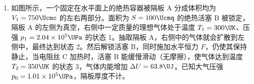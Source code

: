 \documentclass[\gkver]{gaokaozhenti}
\begin{document}
\begin{enumerate}
{（4）相邻两计数点间的时间间隔为 $t = 5T$
打计数点 5 时小车速度的表达式为
$v = \frac{x_{6} - x_{4}}{2t} = \frac{x_{6} - x_{4}}{10T}$
根据逐差法可得小车加速度的表达式是
$a = \frac{x_{6} - x_{3} - x_{3}}{(3t)^{2}} = \frac{x_{6} - 2x_{3}}{(15T)^{2}}$
故选 A。

Ⅱ．（1）把开关 S 接 1，电容器充电，电流从右向左流过微安表，微安表指针迅速向右偏转后示数逐渐减小到零；把开关 S 接 2，电容器放电，电流从左向右流过微安表，则微安表指针迅速向左偏转后示数逐渐减小。故选 C。

（2）由题意可知电压表应选用 $0\sim3\UV$ 量程，由图 2 可知此时分度值为 $0.1\UV$，需要估读到 $0.01\UV$，则读数为 $0.50\UV$。

当微安表示数稳定时，电容器中不再有电流通过，此时干电池、电阻箱、微安表和电压表构成回路，根据闭合电路欧姆定律有
$R + R_{\mathrm{v}} = \frac{E}{I} = \frac{1.5}{160\times10^{-6}}\UO = 9.375\UkO$
根据串联电路规律有
$\frac{R}{R_{\mathrm{v}}} = \frac{U_{R}}{U_{\mathrm{v}}} = \frac{1.5 - 0.5}{0.5} = 2$
联立可得 $R_{\mathrm{v}} \approx 3.1\UkO$

Ⅲ．（1）A．电路 A，定值电阻和热敏电阻并联，电压不变，故不能实现电路的控制，故 A 错误；

B．定值电阻和热敏电阻串联，温度越低，热敏电阻的阻值越大，定值电阻分得电压越小，无法实现 1、2 两端电压大于 $2\UV$，控制开关开启加热系统加热。故 B 错误；

C．定值电阻和热敏电阻串联，温度越低，热敏电阻的阻值越大，热敏电阻分得电压越大，可以实现 1、2 两端电压大于 $2\UV$，控制开关开启加热系统加热。故 C 正确。故选 C。

（2）由热敏电阻 $R_{t}$ 在不同温度时的阻值表可知，$20\UdC$ 的阻值为 $60\times100\UO = 6\UkO$
由题意可知
$U_{12} = \frac{R_{t}}{R_{t} + R}E = \frac{6\UkO}{6\UkO + R}\times3\UV = 2\UV$
解得 $R = 3\UkO$

（3）$28\UdC$ 时 $R_{t}=45\times100\UO=4.5\UkO$，此时 $U_{12}=\frac{4.5\UkO}{4.5\UkO+3\UkO}\times3\UV=1.8\UV$，即 1、2 两端的电压小于 $1.8\UV$ 时，自动关闭加热系统（不考虑控制开关对电路的影响）。
}

\item
如图所示，一个固定在水平面上的绝热容器被隔板 A 分成体积均为 $V_{1} = 750\Ucmc$ 的左右两部分。面积为 $S = 100\Ucmq$ 的绝热活塞 B 被锁定，隔板 A 的左侧为真空，右侧中一定质量的理想气体处于温度 $T_{1} = 300\UK$、压强 $p_{1} = 2.04\times10^{5}\UPa$ 的状态 1。抽取隔板 A，右侧中的气体就会扩散到左侧中，最终达到状态 2。然后解锁活塞 B，同时施加水平恒力 $F$，仍使其保持静止，当电阻丝 C 加热时，活塞 B 能缓慢滑动（无摩擦），使气体达到温度 $T_{2} = 350\UK$ 的状态 3，气体内能增加 $\Delta U = 63.8\UJ$。已知大气压强 $p_{0} = 1.01\times10^{5}\UPa$，隔板厚度不计。


\end{enumerate}
\end{document}
